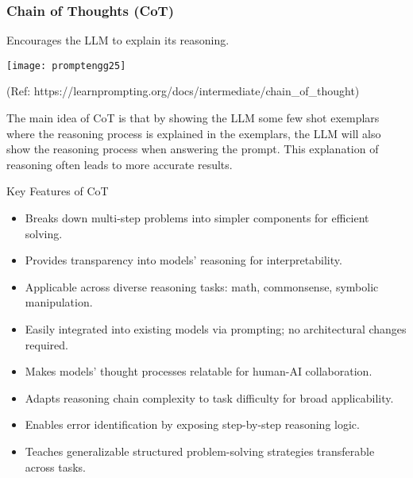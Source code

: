 \begin{frame}[fragile]\frametitle{Chain of Thoughts (CoT)}

Encourages the LLM to explain its reasoning. 

\begin{center}
\texttt{[image: promptengg25]}

{\tiny (Ref: https://learnprompting.org/docs/intermediate/chain\_of\_thought)}

\end{center}		

The main idea of CoT is that by showing the LLM some few shot exemplars where the reasoning process is explained in the exemplars, the LLM will also show the reasoning process when answering the prompt. This explanation of reasoning often leads to more accurate results.

\end{frame}


\begin{frame}[fragile]{Key Features of CoT}
    \begin{itemize}
        \item Breaks down multi-step problems into simpler components for efficient solving.
        \item Provides transparency into models' reasoning for interpretability.
        \item Applicable across diverse reasoning tasks: math, commonsense, symbolic manipulation.
        \item Easily integrated into existing models via prompting; no architectural changes required.
        \item Makes models' thought processes relatable for human-AI collaboration.
        \item Adapts reasoning chain complexity to task difficulty for broad applicability.
        \item Enables error identification by exposing step-by-step reasoning logic.
        \item Teaches generalizable structured problem-solving strategies transferable across tasks.
    \end{itemize}
\end{frame}

